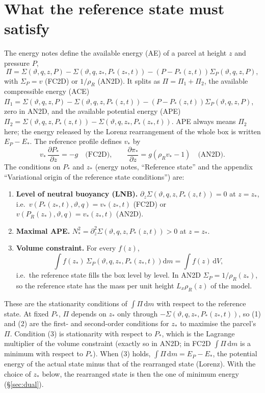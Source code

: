 \documentclass[11pt,a4paper]{article}
\newcommand{\vt}{\vartheta}
\newcommand{\zs}{z_{*}}
\begin{document}
\section{What the reference state must satisfy}\label{sec:theory}
The energy notes define the available energy (AE) of a parcel at height $z$ and pressure $P$,
\begin{equation}
  \Pi=\Sigma(\vt,q,z,P)-\Sigma\left(\vt,q,\zs,P_*(\zs,t)\right)-\left(P-P_*(z,t)\right)\Sigma_P(\vt,q,z,P),
  \label{eq:A}
\end{equation}
with $\Sigma_P=v$ (FC2D) or $1/\rho_R$ (AN2D). It splits as $\Pi=\Pi_1+\Pi_2$, the available compressible energy (ACE)
$\Pi_1=\Sigma(\vt,q,z,P)-\Sigma(\vt,q,z,P_*(z,t))-\left(P-P_*(z,t)\right)\Sigma_P(\vt,q,z,P)$, zero in AN2D, and the available
potential energy (APE) $\Pi_2=\Sigma(\vt,q,z,P_*(z,t))-\Sigma(\vt,q,\zs,P_*(\zs,t))$. APE always means $\Pi_2$ here; the
energy released by the Lorenz rearrangement of the whole box is written $E_P-E_*$. The reference profile defines $v_*$
by
\begin{equation}
  v_*\,\frac{\partial P_*}{\partial z}=-g\quad\text{(FC2D)},\qquad
  \frac{\partial\pi_*}{\partial z}=g\left(\rho_R v_*-1\right)\quad\text{(AN2D)}.
  \label{eq:vstar}
\end{equation}
The conditions on $P_*$ and $\zs$ (energy notes, ``Reference state'' and the appendix ``Variational origin of the reference
state conditions'') are:
\begin{enumerate}
  \item \textbf{Level of neutral buoyancy (LNB).} $\partial_z\Sigma(\vt,q,z,P_*(z,t))=0$ at $z=\zs$, i.e.\
        $v(P_*(\zs,t),\vt,q)=v_*(\zs,t)$ (FC2D) or $v(P_R(\zs),\vt,q)=v_*(\zs,t)$ (AN2D).
  \item \textbf{Maximal APE.} $N_*^2=\partial_z^2\Sigma(\vt,q,z,P_*(z,t))>0$ at $z=\zs$.
  \item \textbf{Volume constraint.} For every $f(z)$,
        \begin{equation}
          \int f(\zs)\,\Sigma_P\left(\vt,q,\zs,P_*(\zs,t)\right)\mathrm{d}m=\int f(z)\,\mathrm{d}V ,
          \label{eq:volume}
        \end{equation}
        i.e.\ the reference state fills the box level by level. In AN2D $\Sigma_P=1/\rho_R(\zs)$, so the reference state has
        the mass per unit height $L_x\rho_R(z)$ of the model.
\end{enumerate}
These are the stationarity conditions of $\int\Pi\,\mathrm{d}m$ with respect to the reference state. At fixed $P_*$, $\Pi$
depends on $\zs$ only through $-\Sigma(\vt,q,\zs,P_*(\zs,t))$, so (1) and (2) are the first- and second-order conditions for
$\zs$ to maximise the parcel's $\Pi$. Condition (3) is stationarity with respect to $P_*$, which is the Lagrange multiplier of the
volume constraint (exactly so in AN2D; in FC2D $\int\Pi\,\mathrm{d}m$ is a minimum with respect to $P_*$). When (3) holds,
$\int\Pi\,\mathrm{d}m=E_P-E_*$, the potential energy of the actual state minus that of the rearranged state (Lorenz). With the
choice of $\zs$ below, the rearranged state is then the one of minimum energy (\S\ref{sec:dual}).
\end{document}
